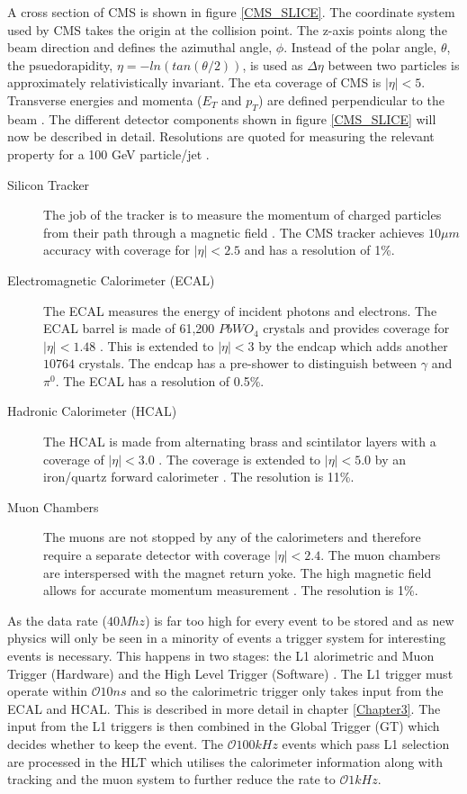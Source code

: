 A cross section of CMS is shown in figure \ref{CMS_SLICE}. The coordinate system used by CMS takes the origin at the collision point. The z-axis points along the beam direction and defines the azimuthal angle, $\phi$. Instead of the polar angle, $\theta$, the psuedorapidity, $\eta=-ln(tan(\theta/2))$, is used as $\Delta \eta$ between two particles is approximately relativistically invariant. The eta coverage of CMS is $|\eta|<5$. Transverse energies and momenta ($E_T $ and $p_T$)  are defined perpendicular to the beam \cite{cmsiop}. The different detector components shown in figure \ref{CMS_SLICE} will now be described in detail. Resolutions are quoted for measuring the relevant property for a 100 GeV particle/jet \cite{SACharacteristics}.
\begin{description}
\item[Silicon Tracker]The job of the tracker is to measure the momentum of charged particles from their path through a magnetic field \cite{siliconTDR}. The CMS tracker achieves $10\mu m$ accuracy with coverage for $|\eta|<2.5$ and has a resolution of 1\%.
\item[Electromagnetic Calorimeter (ECAL)] The ECAL measures the energy of incident photons and electrons. The ECAL barrel is made of 61,200 $PbWO_4$ crystals and provides coverage for $|\eta|<1.48$ \cite{ecal}. This is extended to $|\eta|<3$ by the endcap which adds another $10764$ crystals. The endcap has a pre-shower to distinguish between $\gamma$ and $\pi^0$. The ECAL has a resolution of 0.5\%.
 \item[Hadronic Calorimeter (HCAL)] The HCAL is made from alternating brass and scintilator layers with a coverage of $|\eta|<3.0$ \cite{hcal}. The coverage is extended to  $|\eta|<5.0$ by an iron/quartz forward calorimeter \cite{hfhcal}. The resolution is 11\%. 
 \item[Muon Chambers]The muons are not stopped by any of the calorimeters and therefore require a separate detector with coverage $|\eta| < 2.4$. The muon chambers are interspersed with the magnet return yoke. The high magnetic field allows for accurate momentum measurement \cite{muons}. The resolution is 1\%.
\end{description}
As the data rate ($40Mhz$) is far too high for every event to be stored and as new physics will only be seen in a minority of events a trigger system for interesting events is necessary. This happens in two stages: the L1 
alorimetric and Muon Trigger (Hardware) and the High Level Trigger (Software) \cite{HLT}. The L1 trigger must operate within $\mathcal{O}10ns$ and so  the calorimetric trigger only takes input from the ECAL and HCAL. This is described in more detail in chapter \ref{Chapter3}. The input from the L1 triggers is then combined in the Global Trigger (GT) which decides whether to keep the event. The $\mathcal{O}100kHz$ events which pass L1 selection are processed in the HLT which utilises the calorimeter information along with tracking and the muon system to further reduce the rate to $\mathcal{O}1kHz$.

